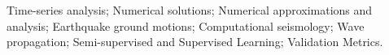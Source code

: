 Time-series analysis; Numerical solutions; Numerical approximations and analysis; Earthquake ground motions; Computational seismology; Wave propagation; Semi-supervised and Supervised Learning; Validation Metrics.